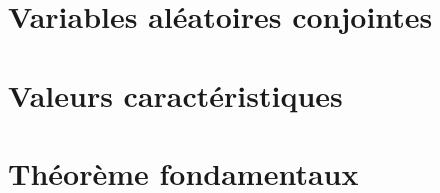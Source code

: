 \documentclass[letterpaper,10pt,english]{jupyterBook}
\begin{document}
\chapter{Variables aléatoires conjointes}
\label{\detokenize{Probabilit_xe9/variables_aleatoires_conjointes:variables-aleatoires-conjointes}}\label{\detokenize{Probabilit_xe9/variables_aleatoires_conjointes::doc}}
\sphinxstepscope


\chapter{Valeurs caractéristiques}
\label{\detokenize{Probabilit_xe9/valeurs_caracteristiques:valeurs-caracteristiques}}\label{\detokenize{Probabilit_xe9/valeurs_caracteristiques::doc}}
\sphinxstepscope


\chapter{Théorème fondamentaux}
\label{\detokenize{Probabilit_xe9/theoreme_fondamentaux:theoreme-fondamentaux}}\label{\detokenize{Probabilit_xe9/theoreme_fondamentaux::doc}}
\sphinxstepscope
\end{document}
